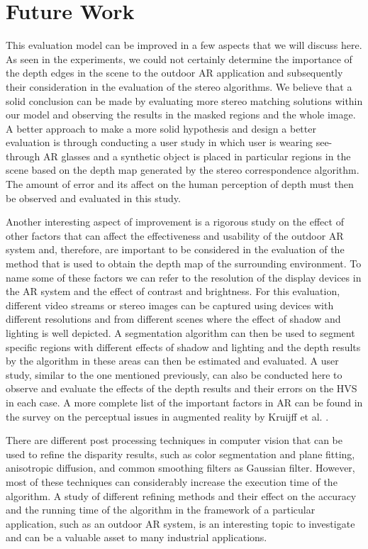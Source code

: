 \section{Future Work}
This evaluation model can be improved in a few aspects that we will discuss here.
As seen in the experiments, we could not certainly determine the importance of the depth edges in the scene to the outdoor AR application and subsequently their consideration in the evaluation 
of the stereo algorithms. We believe that a solid conclusion can be made by evaluating more stereo matching solutions
within our model and observing the results in the masked regions and the whole image. A better approach to make a more solid hypothesis and design a better 
evaluation is through conducting a user study in which user is wearing see-through AR glasses and a synthetic object is placed in particular regions in the scene based on the depth map generated by the stereo correspondence algorithm. The amount of error and its affect on the human perception of depth must then be observed and evaluated in this study. 

Another interesting aspect of improvement is a rigorous study on the effect of other factors that can affect the effectiveness and 
usability of the outdoor AR system and, therefore, 
are important to be considered in the evaluation of the method that is used to obtain the depth map of the surrounding environment. 
To name some of these factors we can refer to
the resolution of the display devices in the AR system and the effect of contrast and brightness. 
For this evaluation, different video streams or stereo images can be captured using devices with different resolutions 
and from different scenes where the effect of shadow and lighting is well depicted. A segmentation algorithm can then be used to 
segment specific regions with different effects of shadow and lighting and the depth results by the algorithm in these areas can then be estimated and evaluated. 
A user study, similar to the one mentioned previously, can also be conducted here to observe and evaluate the effects of the depth results and 
their errors on the HVS in each case.  
A more complete list of the important factors in AR can be
found in the survey on the perceptual issues in augmented reality by Kruijff et al. \cite{kru10}.

There are different post processing techniques in computer vision that can be used to refine the disparity results, such as color segmentation and plane fitting, 
anisotropic diffusion, and common smoothing filters as Gaussian filter. However, most of these techniques can considerably increase the execution time of the algorithm.
A study of different refining methods and their effect on the accuracy and the running time of the algorithm in the framework of a particular application, 
such as an outdoor AR system, is an interesting topic to investigate and can be a valuable asset to many industrial applications.

